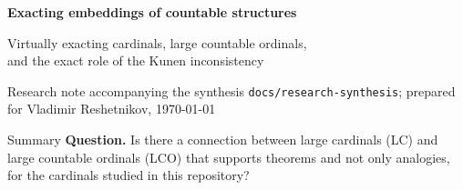 \documentclass[11pt,letterpaper]{article}
\theoremstyle{definition}
\numberwithin{equation}{section}
\begin{document}
\thispagestyle{empty}
\begin{center}
{\sffamily\bfseries\color{Forest}\fontsize{20}{24}\selectfont Exacting embeddings of countable structures\par}
\vspace{6pt}
{\fontsize{13}{17}\selectfont Virtually exacting cardinals, large countable ordinals,\\ and the exact role of the Kunen inconsistency\par}
\vspace{8pt}
{\small Research note accompanying the synthesis \nolinkurl{docs/research-synthesis}; prepared for Vladimir Reshetnikov, \today}
\end{center}
\vspace{4pt}

\begin{assessment}{Summary}
\textbf{Question.} Is there a connection between large cardinals (LC) and large countable ordinals (LCO) that supports theorems and not only analogies, for the cardinals studied in this repository?


\end{assessment}
\end{document}
